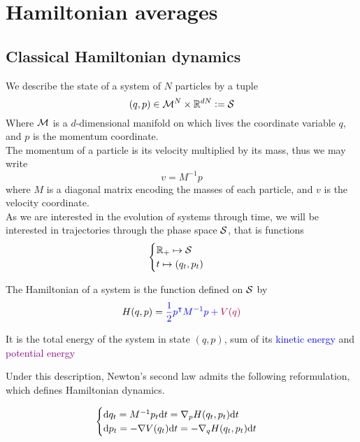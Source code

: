 \section{Hamiltonian averages}
\subsection{Classical Hamiltonian dynamics}
    \begin{definition}
    We describe the state of a system of $N$ particles by a tuple 
    $$(q,p)\in \mathcal{M}^N\times \mathbb{R}^{dN} \mathrel{\mathop:}= \mathcal{S}$$
    Where $\mathcal{M}$ is a $d$-dimensional manifold on which lives the coordinate variable $q$, and $p$ is the momentum coordinate.\\
    The momentum of a particle is its velocity multiplied by its mass, thus we may write 
    $$v=M^{-1}p$$
    where $M$ is a diagonal matrix encoding the masses of each particle, and $v$ is the velocity coordinate.\\
    As we are interested in the evolution of systems through time, we will be interested in trajectories through the phase space $\mathcal{S}$, that is functions
    $$\begin{cases}\mathbb{R}_+\mapsto \mathcal{S}\\
        t\mapsto (q_t,p_t)
    \end{cases}$$
    \end{definition}
        \begin{definition}[Hamiltonian]
            The Hamiltonian of a system is the function defined on $\mathcal{S}$ by\\

            \begin{equation}
                \label{Hamiltonian}
                H(q,p)=\color{blue}{\frac12p^\intercal M^{-1}p}+\color{purple}{V(q)}
            \end{equation}
            
            It is the total energy of the system in state $(q,p)$, sum of its \textcolor{blue}{kinetic energy} and \textcolor{purple}{potential energy}
        \end{definition}

        Under this description, Newton's second law admits the following reformulation, which defines Hamiltonian dynamics.

        \begin{equation}
            \label{Hamiltonian dynamics}
            \begin{cases}
                \text d q_t=M^{-1}p_t\text dt=\nabla_p H(q_t,p_t)\text dt\\
                \text d p_t=-\nabla V(q_t)\text dt=-\nabla_q H(q_t,p_t)\text dt
            \end{cases}
        \end{equation}



